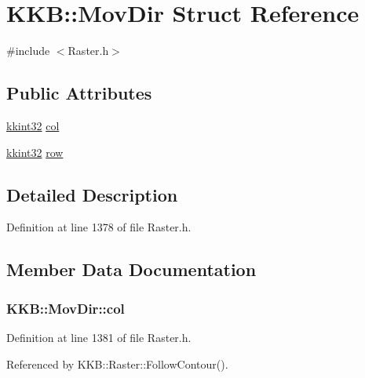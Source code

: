 \hypertarget{struct_k_k_b_1_1_mov_dir}{}\section{K\+KB\+:\+:Mov\+Dir Struct Reference}
\label{struct_k_k_b_1_1_mov_dir}


{\ttfamily \#include $<$Raster.\+h$>$}

\subsection*{Public Attributes}
\begin{DoxyCompactItemize}
\item 
\hyperlink{namespace_k_k_b_a8fa4952cc84fda1de4bec1fbdd8d5b1b}{kkint32} \hyperlink{struct_k_k_b_1_1_mov_dir_a454172afc7221cea2367c722c34e5517}{col}
\item 
\hyperlink{namespace_k_k_b_a8fa4952cc84fda1de4bec1fbdd8d5b1b}{kkint32} \hyperlink{struct_k_k_b_1_1_mov_dir_a19c78385b3fbec09dbe624baef003187}{row}
\end{DoxyCompactItemize}


\subsection{Detailed Description}


Definition at line 1378 of file Raster.\+h.



\subsection{Member Data Documentation}
\subsubsection[{\texorpdfstring{col}{col}}]{ K\+K\+B\+::\+Mov\+Dir\+::col}\hypertarget{struct_k_k_b_1_1_mov_dir_a454172afc7221cea2367c722c34e5517}{}\label{struct_k_k_b_1_1_mov_dir_a454172afc7221cea2367c722c34e5517}


Definition at line 1381 of file Raster.\+h.



Referenced by K\+K\+B\+::\+Raster\+::\+Follow\+Contour().

